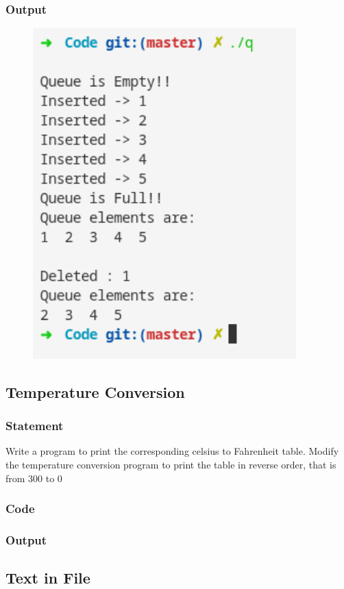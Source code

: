 \subsubsection{Output}
\begin{figure}[!htb]
  \centering
  \includegraphics[width=4in]{Images/q.png}
  \label{output:11}
\end{figure}


\pagebreak
\subsection{Temperature Conversion}
\subsubsection{Statement}
Write a program to print the corresponding celsius to Fahrenheit table. Modify the
temperature conversion program to print the table in reverse order, that is from 300 to 0
\subsubsection{Code}
\subsubsection{Output}

\pagebreak
\subsection{Text in File}
